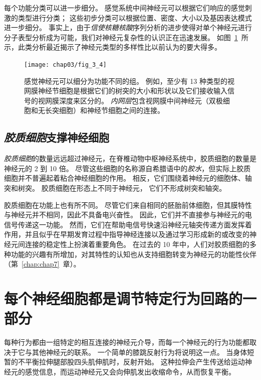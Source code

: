 每个功能分类可以进一步细分。 
感觉系统中间神经元可以根据它们响应的感觉刺激的类型进行分类； 
这些初步分类可以根据位置、密度、大小以及基因表达模式进一步细分。
事实上，由于\textit{信使核糖核酸}序列分析的进步使得对单个神经元进行分子表型分析成为可能，我们对神经元复杂性的认识正在迅速发展。 
如图~\ref{fig:3_4}~所示，此类分析最近揭示了神经元类型的多样性比以前认为的要大得多。


\begin{figure}[htbp]
	\centering
	\texttt{[image: chap03/fig\_3\_4]}
	\caption{感觉神经元可以细分为功能不同的组。
		例如，至少有 13 种类型的视网膜神经节细胞是根据它们的树突的大小和形状以及它们接收输入信号的视网膜深度来区分的。
		\textit{内网层}包含视网膜中间神经元（双极细胞和无长突细胞）和神经节细胞之间的连接\cite{dacey2003fireworks}。}
	\label{fig:3_4}
\end{figure}



\subsection{\textit{胶质细胞}支撑神经细胞}
\textit{胶质细胞}的数量远远超过神经元，在脊椎动物中枢神经系统中，胶质细胞的数量是神经元的 2 到 10 倍。
尽管这些细胞的名称源自希腊语中的\textit{胶水}，但实际上胶质细胞并不普遍起着粘合神经细胞的作用。
相反，它们围绕着神经元的细胞体、轴突和树突。
胶质细胞在形态上不同于神经元，
它们不形成树突和轴突。


胶质细胞在功能上也有所不同。
尽管它们来自相同的胚胎前体细胞，但其膜特性与神经元并不相同，因此不具备电兴奋性。
因此，它们并不直接参与神经元的电信号传递这一功能。
然而，它们在帮助电信号快速沿神经元轴突传递方面发挥着作用，并且似乎在早期发育过程中指导神经连接以及通过学习形成新的或改变的神经元间连接的稳定性上扮演着重要角色。
在过去的 10 年中，人们对胶质细胞的多种功能的兴趣有所增加，对其特性的认知也从支持细胞转变为神经元的功能性伙伴（第~\ref{chap:chap7}~章）。



\section{每个神经细胞都是调节特定行为回路的一部分}

每种行为都由一组特定的相互连接的神经元介导，而每一个神经元的行为功能都取决于它与其他神经元的联系。
一个简单的膝跳反射行为将说明这一点。
当身体短暂的不平衡拉伸腿部股四头肌伸肌时，反射开始。
这种拉伸会产生传送给运动神经元的感觉信息，而运动神经元又会向伸肌发出收缩命令，从而恢复平衡。


